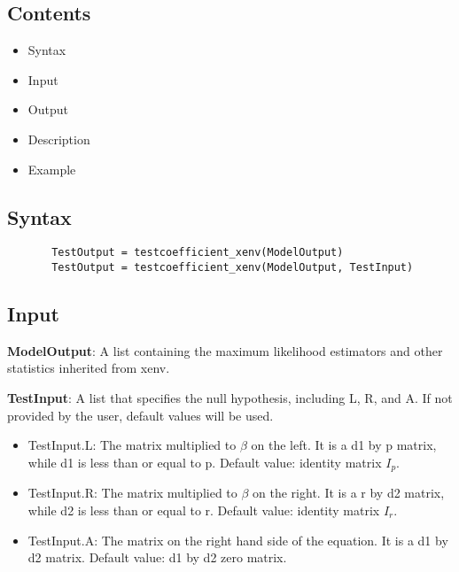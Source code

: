 \documentclass[a4paper,11pt,openany]{memoir}
\begin{document}
\subsection*{Contents}

\begin{itemize}
\setlength{\itemsep}{-1ex}
   \item Syntax
   \item Input
   \item Output
   \item Description
   \item Example
\end{itemize}


\subsection*{Syntax}


\begin{verbatim}       TestOutput = testcoefficient_xenv(ModelOutput)
       TestOutput = testcoefficient_xenv(ModelOutput, TestInput)\end{verbatim}
    

\subsection*{Input}

\begin{par}
\textbf{ModelOutput}: A list containing the maximum likelihood estimators and other statistics inherited from xenv.
\end{par} \vspace{1em}
\begin{par}
\textbf{TestInput}: A list that specifies the null hypothesis, including L, R, and A.  If not provided by the user, default values will be used.
\end{par} \vspace{1em}
\begin{itemize}
\setlength{\itemsep}{-1ex}
   \item TestInput.L: The matrix multiplied to $\beta$ on the left.  It is a d1 by p matrix, while d1 is less than or equal to p.  Default value: identity matrix $I_p$.
   \item TestInput.R: The matrix multiplied to $\beta$ on the right.  It is a r by d2 matrix, while d2 is less than or equal to r.  Default value: identity matrix $I_r$.
   \item TestInput.A: The matrix on the right hand side of the equation.  It is a d1 by d2 matrix.  Default value: d1 by d2 zero matrix.
\end{itemize}
\end{document}
